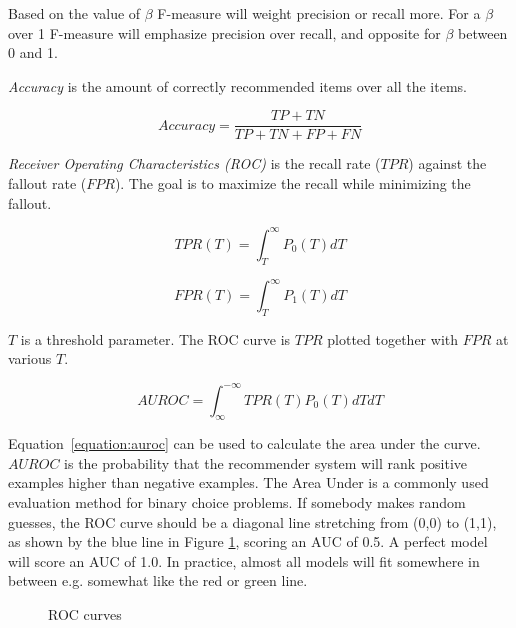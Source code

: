 Based on the value of $\beta$ F-measure will weight precision or recall more.
For a $\beta$ over 1 F-measure will emphasize precision over recall, and
opposite for $\beta$ between 0 and 1.

\textit{Accuracy} is the amount of correctly recommended items over all the
items.

\begin{equation}
    Accuracy = \frac{TP+TN}{TP+TN+FP+FN}
    \label{equation:accuracy}
\end{equation}

\textit{Receiver Operating Characteristics (ROC)} is the recall rate ($TPR$)
against the fallout rate ($FPR$).  The goal is to maximize the recall while
minimizing the fallout.

\begin{equation}
    TPR(T) = \int_T^\infty P_0(T)dT
    \label{equation:tpr}
\end{equation}

\begin{equation}
    FPR(T) = \int_T^\infty P_1(T)dT
    \label{equation:fpr}
\end{equation}

$T$ is a threshold parameter.  The ROC curve is $TPR$ plotted together with
$FPR$ at various $T$.

\begin{equation}
    AUROC = \int_\infty^{-\infty} TPR(T)P_0(T)dTdT
    \label{equation:auroc}
\end{equation}

Equation~\ref{equation:auroc} can be used to calculate the area under the
curve.  $AUROC$ is the probability that the recommender system will rank
positive examples higher than negative examples.  The Area Under is a commonly
used evaluation method for binary choice problems. If somebody makes random
guesses, the ROC curve should be a diagonal line stretching from (0,0) to
(1,1), as shown by the blue line in Figure \ref{fig:aucroc}, scoring an AUC of
0.5. A perfect model will score an AUC of 1.0. In practice, almost all models
will fit somewhere in between e.g. somewhat like the red or green line.

\begin{figure}[H]
\label{fig:aucroc}
  \centering
    \caption{ROC curves}
\end{figure}

